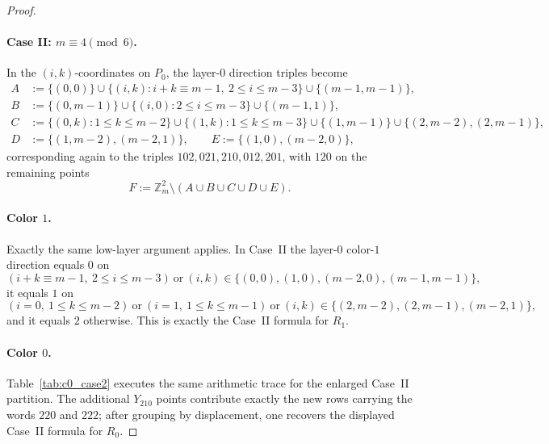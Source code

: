 \documentclass[11pt]{article}
\begin{document}
\begin{proof}
\paragraph{Case II: $m\equiv 4\pmod 6$.}
In the $(i,k)$-coordinates on $P_0$, the layer-$0$ direction triples become
\begin{align*}
A&:=\{(0,0)\}\cup\{(i,k):i+k\equiv m-1,\ 2\le i\le m-3\}\cup\{(m-1,m-1)\},\\
B&:=\{(0,m-1)\}\cup\{(i,0):2\le i\le m-3\}\cup\{(m-1,1)\},\\
C&:=\{(0,k):1\le k\le m-2\}\cup\{(1,k):1\le k\le m-3\}\cup\{(1,m-1)\}\cup\{(2,m-2),(2,m-1)\},\\
D&:=\{(1,m-2),(m-2,1)\},\qquad E:=\{(1,0),(m-2,0)\},
\end{align*}
corresponding again to the triples $102,021,210,012,201$, with $120$ on the remaining points
\[
F:=\mathbb Z_m^2\setminus (A\cup B\cup C\cup D\cup E).
\]

\paragraph{Color $1$.}
Exactly the same low-layer argument applies.
In Case~II the layer-$0$ color-$1$ direction equals $0$ on
\[
(i+k\equiv m-1,\ 2\le i\le m-3)\ \text{or}\ (i,k)\in\{(0,0),(1,0),(m-2,0),(m-1,m-1)\},
\]
it equals $1$ on
\[
(i=0,\ 1\le k\le m-2)\ \text{or}\ (i=1,\ 1\le k\le m-1)\ \text{or}\ (i,k)\in\{(2,m-2),(2,m-1),(m-2,1)\},
\]
and it equals $2$ otherwise.
This is exactly the Case~II formula for $R_1$.

\paragraph{Color $0$.}
Table~\ref{tab:c0_case2} executes the same arithmetic trace for the enlarged Case~II partition.
The additional $Y_{210}$ points contribute exactly the new rows carrying the words $220$ and $222$; after grouping by displacement, one recovers the displayed Case~II formula for $R_0$.


\end{proof}
\end{document}

